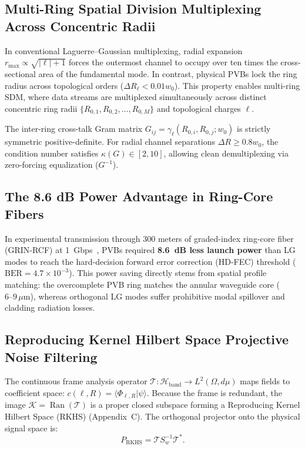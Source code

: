 \documentclass[11pt,a4paper]{article}
\begin{document}
\subsection{Multi-Ring Spatial Division Multiplexing Across Concentric Radii}

In conventional Laguerre--Gaussian multiplexing, radial expansion $r_{\max} \propto \sqrt{|\ell| + 1}$ forces the outermost channel to occupy over ten times the cross-sectional area of the fundamental mode. In contrast, physical PVBs lock the ring radius across topological orders ($\Delta R_\ell < 0.01 w_0$). This property enables multi-ring SDM, where data streams are multiplexed simultaneously across distinct concentric ring radii $\{R_{0, 1}, R_{0, 2}, \dots, R_{0, M}\}$ and topological charges $\ell$.

The inter-ring cross-talk Gram matrix $G_{ij} = \gamma_\ell(R_{0, i}, R_{0, j}; w_0)$ is strictly symmetric positive-definite. For radial channel separations $\Delta R \ge 0.8 w_0$, the condition number satisfies $\kappa(G) \in [2, 10]$, allowing clean demultiplexing via zero-forcing equalization ($G^{-1}$).

\subsection{The 8.6 dB Power Advantage in Ring-Core Fibers}

In experimental transmission through 300 meters of graded-index ring-core fiber (GRIN-RCF) at 1~Gbps~\cite{Villalba2023}, PVBs required \textbf{8.6~dB less launch power} than LG modes to reach the hard-decision forward error correction (HD-FEC) threshold ($\text{BER} = 4.7 \times 10^{-3}$). This power saving directly stems from spatial profile matching: the overcomplete PVB ring matches the annular waveguide core ($6\text{--}9\,\mu\text{m}$), whereas orthogonal LG modes suffer prohibitive modal spillover and cladding radiation losses.

\subsection{Reproducing Kernel Hilbert Space Projective Noise Filtering}

The continuous frame analysis operator $\mathcal{T}: \mathcal{H}_{\text{band}} \to L^2(\Omega, d\mu)$ maps fields to coefficient space: $c(\ell, R) = \langle \Phi_{\ell, R} | \psi \rangle$. Because the frame is redundant, the image $\mathcal{K} = \operatorname{Ran}(\mathcal{T})$ is a proper closed subspace forming a Reproducing Kernel Hilbert Space (RKHS) (Appendix~C). The orthogonal projector onto the physical signal space is:
\begin{equation}
\boxed{P_{\text{RKHS}} = \mathcal{T} S_w^{-1} \mathcal{T}^*.}
\end{equation}
\end{document}
